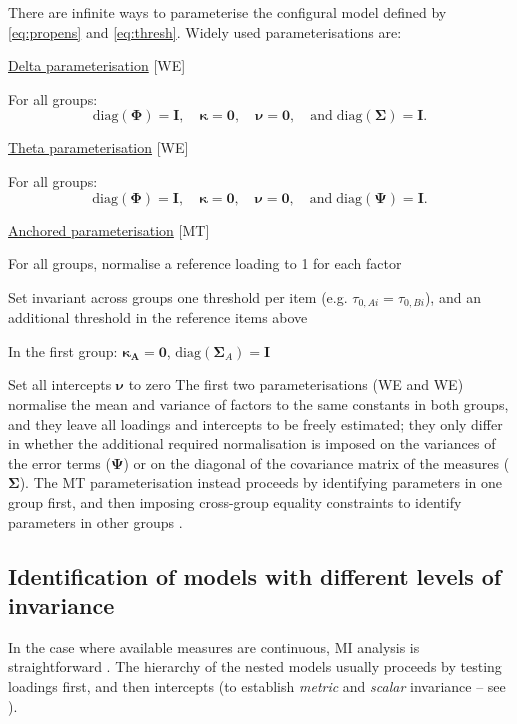 There are infinite ways to parameterise the configural model defined by \eqref{eq:propens} and \eqref{eq:thresh}. Widely used parameterisations are:
\bi[label=$\diamond$]
\item \underline{Delta parameterisation} {[WE{\textDelta}]} \citep{Wu2016a}

For all groups: $$\text{diag}(\bm{\Phi}) = \bm{I}, \quad \bm{\kappa}=\bm{0}, \quad \bm{\nu}=\bm{0}, \quad \text{and} \; \text{diag}(\bm{\Sigma})=\bm{I}.$$

\item \underline{Theta parameterisation} {[WE{\textTheta}]} \citep{Wu2016a}

For all groups: $$\text{diag}(\bm{\Phi}) = \bm{I}, \quad \bm{\kappa}=\bm{0}, \quad \bm{\nu}=\bm{0}, \quad \text{and} \; \text{diag}(\bm{\Psi})=\bm{I}.$$

\item \underline{Anchored parameterisation} {[MT]} \citep{Millsap2004}
  \bi
  \item For all groups, normalise a reference loading to 1 for each factor
  \item Set invariant across groups one threshold per item (e.g. $\tau_{0,Ai} = \tau_{0,Bi}$), and an additional threshold in the reference items above
  \item In the first group: $\bm{\kappa_A}=\bm{0}$, $\text{diag}(\bm{\Sigma}_A)=\bm{I}$
  \item Set all intercepts $\bm{\nu}$ to zero
  \ei
\ei
The first two parameterisations (WE{\textDelta} and WE{\textTheta}) normalise the mean and variance of factors to the same constants in both groups, and they leave all loadings and intercepts to be freely estimated; they only differ in whether the additional required normalisation is imposed on the variances of the error terms ($\bm{\Psi}$) or on the diagonal of the covariance matrix of the measures ($\bm{\Sigma}$). The MT parameterisation instead proceeds by identifying parameters in one group first, and then imposing cross-group equality constraints to identify parameters in other groups \citep{Wu2016a}.

\subsection{Identification of models with different levels of invariance}

In the case where available measures are continuous, MI analysis is straightforward \citep{vandeSchoot2012}. The hierarchy of the nested models usually proceeds by testing loadings first, and then intercepts (to establish \emph{metric} and \emph{scalar} invariance -- see \citealp{Vandenberg2000a}).

